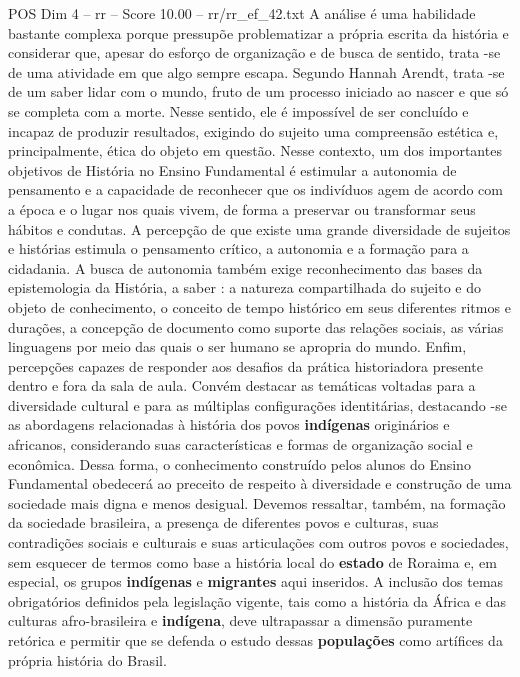 \begin{textsample}{POS Dim 4 – rr – Score 10.00 – rr/rr\_ef\_42.txt}
A análise é uma habilidade bastante complexa porque pressupõe problematizar a própria escrita da história e considerar que, apesar do esforço de organização e de busca de sentido, trata -se de uma atividade em que algo sempre escapa.
Segundo Hannah Arendt, trata -se de um saber lidar com o mundo, fruto de um processo iniciado ao nascer e que só se completa com a morte.
Nesse sentido, ele é impossível de ser concluído e incapaz de produzir resultados, exigindo do sujeito uma compreensão estética e, principalmente, ética do objeto em questão.
Nesse contexto, um dos importantes objetivos de História no Ensino Fundamental é estimular a autonomia de pensamento e a capacidade de reconhecer que os indivíduos agem de acordo com a época e o lugar nos quais vivem, de forma a preservar ou transformar seus hábitos e condutas.
A percepção de que existe uma grande diversidade de sujeitos e histórias estimula o pensamento crítico, a autonomia e a formação para a cidadania.
A busca de autonomia também exige reconhecimento das bases da epistemologia da História, a saber : a natureza compartilhada do sujeito e do objeto de conhecimento, o conceito de tempo histórico em seus diferentes ritmos e durações, a concepção de documento como suporte das relações sociais, as várias linguagens por meio das quais o ser humano se apropria do mundo.
Enfim, percepções capazes de responder aos desafios da prática historiadora presente dentro e fora da sala de aula.
Convém destacar as temáticas voltadas para a diversidade cultural e para as múltiplas configurações identitárias, destacando -se as abordagens relacionadas à história dos povos \textbf{indígenas} originários e africanos, considerando suas características e formas de organização social e econômica.
Dessa forma, o conhecimento construído pelos alunos do Ensino Fundamental obedecerá ao preceito de respeito à diversidade e construção de uma sociedade mais digna e menos desigual.
Devemos ressaltar, também, na formação da sociedade brasileira, a presença de diferentes povos e culturas, suas contradições sociais e culturais e suas articulações com outros povos e sociedades, sem esquecer de termos como base a história local do \textbf{estado} de Roraima e, em especial, os grupos \textbf{indígenas} e \textbf{migrantes} aqui inseridos.
A inclusão dos temas obrigatórios definidos pela legislação vigente, tais como a história da África e das culturas afro-brasileira e \textbf{indígena}, deve ultrapassar a dimensão puramente retórica e permitir que se defenda o estudo dessas \textbf{populações} como artífices da própria história do Brasil.

\end{textsample}
